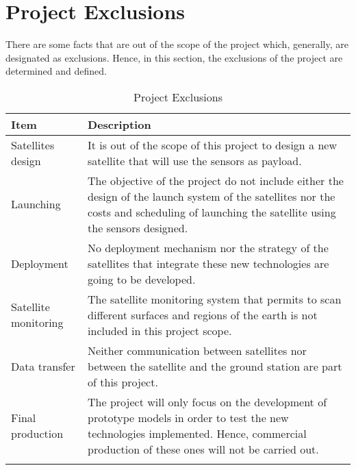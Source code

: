 \section{Project Exclusions}

There are some facts that are out of the scope of the project which, generally, are designated as exclusions. Hence, in this section, the exclusions of the project are determined and defined. 

\begin{longtable}[H]{lp{11cm}}
	
	\toprule[2pt]
	
	\textbf{Item} & \textbf{Description} \\
	
	\midrule[1.5pt] 
	\endhead
	
	Satellites design & It is out of the scope of this project to design a new satellite that will use the sensors as payload.\vspace{0.2cm} \\
	
	\midrule
	
	Launching  & The objective of the project do not include either the design of the launch system of the satellites nor the costs and scheduling of launching the satellite using the sensors designed.\vspace{0.2cm} \\
	
	\midrule
	
	Deployment & No deployment mechanism nor the strategy of the satellites that integrate these new technologies are going to be developed.\vspace{0.2cm} \\
	
	\midrule
	
	Satellite monitoring & The satellite monitoring system that permits to scan different surfaces and regions of the earth is not included in this project scope.\vspace{0.2cm} \\
	
	\midrule
	
	Data transfer & Neither communication between satellites nor between the satellite and the ground station are part of this project.\vspace{0.2cm} \\
	
	\midrule
		
	Final production & The project will only focus on the development of prototype models in order to test the new technologies implemented. Hence, commercial production of these ones will not be carried out.\vspace{0.2cm} \\
	
	\bottomrule[2pt]
	
	\caption{Project Exclusions}
\end{longtable}